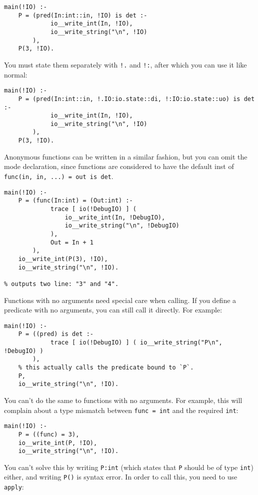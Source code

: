 \begin{lstlisting}[language=Mercury]
main(!IO) :-
	P = (pred(In:int::in, !IO) is det :-
		     io__write_int(In, !IO),
		     io__write_string("\n", !IO)
		),
	P(3, !IO).
\end{lstlisting}

You must state them separately with \texttt{!.} and \texttt{!:}, after which you can use it like normal:

\begin{lstlisting}[language=Mercury]
main(!IO) :-
	P = (pred(In:int::in, !.IO:io.state::di, !:IO:io.state::uo) is det :-
		     io__write_int(In, !IO),
		     io__write_string("\n", !IO)
		),
	P(3, !IO).
\end{lstlisting}

Anonymous functions can be written in a similar fashion, but you can omit the mode declaration, since functions are considered to have the default inst of \texttt{func(in, in, ...) = out is det}.

\begin{lstlisting}[language=Mercury]
main(!IO) :-
	P = (func(In:int) = (Out:int) :-
			 trace [ io(!DebugIO) ] (
				 io__write_int(In, !DebugIO),
				 io__write_string("\n", !DebugIO)
			 ),
			 Out = In + 1
		),
	io__write_int(P(3), !IO),
	io__write_string("\n", !IO).

% outputs two line: "3" and "4".
\end{lstlisting}

Functions with no arguments need special care when calling. If you define a predicate with no arguments, you can still call it directly. For example:

\begin{lstlisting}[language=Mercury]
main(!IO) :-
	P = ((pred) is det :-
			 trace [ io(!DebugIO) ] ( io__write_string("P\n", !DebugIO) )
		),
    % this actually calls the predicate bound to `P`.
	P,  
	io__write_string("\n", !IO).
\end{lstlisting}

You can't do the same to functions with no arguments. For example, this will complain about a type mismatch between \texttt{func = int} and the required \texttt{int}:

\begin{lstlisting}[language=Mercury]
main(!IO) :-
	P = ((func) = 3),
	io__write_int(P, !IO),
	io__write_string("\n", !IO).
\end{lstlisting}

You can't solve this by writing \texttt{P:int} (which states that \texttt{P} should be of type \texttt{int}) either, and writing \texttt{P()} is syntax error. In order to call this, you need to use \texttt{apply}:

